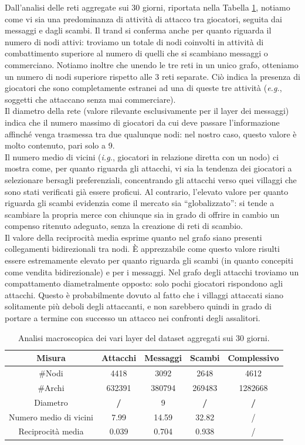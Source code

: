 Dall'analisi delle reti aggregate sui 30 giorni, riportata nella Tabella \ref{tab:summary}, notiamo come vi sia una predominanza di attività di attacco tra giocatori, seguita dai messaggi e dagli scambi. Il trand si conferma anche per quanto riguarda il numero di nodi attivi: troviamo un totale di nodi coinvolti in attività di combattimento superiore al numero di quelli che si scambiano messaggi o commerciano. Notiamo inoltre che unendo le tre reti in un unico grafo, otteniamo un numero di nodi superiore rispetto alle 3 reti separate. Ciò indica la presenza di giocatori che sono completamente estranei ad una di queste tre attività (\textit{e.g.}, soggetti che attaccano senza mai commerciare).\\
Il diametro della rete (valore rilevante esclusivamente per il layer dei messaggi) indica che il numero massimo di giocatori da cui deve passare l'informazione affinché venga trasmessa tra due qualunque nodi: nel nostro caso, questo valore è molto contenuto, pari solo a 9.\\
Il numero medio di vicini (\textit{i.g.}, giocatori in relazione diretta con un nodo) ci mostra come, per quanto riguarda gli attacchi, vi sia la tendenza dei giocatori a selezionare bersagli preferenziali, concentrando gli attacchi verso quei villaggi che sono stati verificati già essere proficui. Al contrario, l'elevato valore per quanto riguarda gli scambi evidenzia come il mercato sia “globalizzato”: si tende a scambiare la propria merce con chiunque sia in grado di offrire in cambio un compenso ritenuto adeguato, senza la creazione di reti di scambio.\\
Il valore della reciprocità media esprime quanto nel grafo siano presenti collegamenti bidirezionali tra nodi. È apprezzabile come questo valore risulti essere estremamente elevato per quanto riguarda gli scambi (in quanto concepiti come vendita bidirezionale) e per i messaggi. Nel grafo degli attacchi troviamo un compattamento diametralmente opposto: solo pochi giocatori rispondono agli attacchi. Questo è probabilmente dovuto al fatto che i villaggi attaccati siano solitamente più deboli degli attaccanti, e non sarebbero quindi in grado di portare a termine con successo un attacco nei confronti degli assalitori.
\begin{table}[h]
	\centering
	\caption{Analisi macroscopica dei vari layer del dataset aggregati sui 30 giorni.}
	\begin{tabular}{|c|c|c|c|c|}
		\hline 
		Misura & Attacchi & Messaggi & Scambi & Complessivo \\ 
		\hline 
		$\#$Nodi & 4418 & 3092 & 2648 & 4612 \\ 
		\hline 
		$\#$Archi & 632391 & 380794 & 269483 & 1282668 \\ 
		\hline 
		Diametro & \textbf{/} & 9 & \textbf{/} & \textbf{/} \\ 
		\hline 
		Numero medio di vicini & 7.99 & 14.59 & 32.82 & / \\ 
		\hline 
		Reciprocità media & 0.039 & 0.704 & 0.938 & / \\ 
		\hline 
	\end{tabular} 
	\label{tab:summary}
\end{table}

